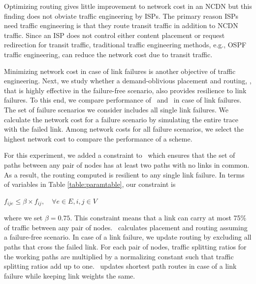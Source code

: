 Optimizing routing gives little improvement to network cost in an NCDN but this finding does not obviate traffic engineering by ISPs. The primary reason ISPs need traffic engineering is that they route transit traffic in addition to NCDN traffic. Since an ISP does not control either content placement or request redirection for transit traffic, traditional traffic engineering methods, e.g., OSPF traffic engineering, can reduce the network cost due to transit traffic.

Minimizing network cost in case of link failures is another objective of traffic engineering. Next, we study whether a demand-oblivious placement and routing, \invlru, that is highly effective in the failure-free scenario, also provides resilience to link failures. To this end, we compare performance of \invlru\ and \optrpfuture\  in case of link failures. The set of failure scenarios we consider includes all single link failures. We calculate the network cost for a failure scenario by simulating the entire trace with the failed link.  Among network costs for all failure scenarios, we select the highest network cost to compare the performance of a scheme.







For this experiment, we added a constraint to \optrpfuture\ which ensures that the set of paths between any pair of nodes has at least two paths with no links in common. As a result, the routing computed is resilient to any single link failure. In terms of variables in Table \ref{table:paramtable}, our constraint is 

\begin{center}
$f_{ije} \leq \beta \times f_{ij}, \quad \forall e \in E, i,j \in V $
\end{center}

\noindent where we set $\beta = 0.75$. This constraint means that a link can carry at most 75\% of traffic between any pair of nodes. \optrpfuture\ calculates placement and routing assuming a failure-free scenario. In case of a link failure, we update routing by excluding all paths that cross the failed link. For each pair of nodes, traffic splitting ratios for the working paths are multiplied by a normalizing constant such that traffic splitting ratios add up to one. \invlru\ updates shortest path routes in case of a link failure while keeping link weights the same.




